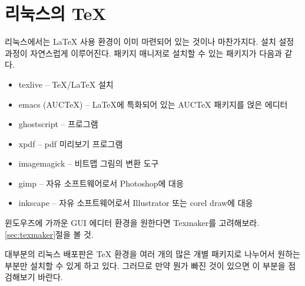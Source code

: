 \section{리눅스의 \TeX}

리눅스에서는 \LaTeX{} 사용 환경이 이미 마련되어 있는 것이나 마찬가지다.
설치 설정 과정이 자연스럽게 이루어진다.
패키지 매니저로 설치할 수 있는 패키지가 다음과 같다.

\begin{itemize}
\item texlive -- \TeX/\LaTeX{} 설치
\item emacs (AUCTeX) -- \LaTeX{}에 특화되어 있는 AUCTeX 패키지를 얹은 에디터
\item ghostscript -- \PSi{} 프로그램
\item xpdf -- pdf 미리보기 프로그램 
\item imagemagick -- 비트맵 그림의 변환 도구
\item gimp -- 자유 소프트웨어로서 Photoshop에 대응
\item inkscape -- 자유 소프트웨어로서 Illustrator 또는 corel draw에 대응
\end{itemize}

윈도우즈에 가까운 GUI 에디터 환경을 원한다면 Texmaker를 고려해보라. \ref{sec:texmaker}절을 볼 것.

대부분의 리눅스 배포판은 \TeX{} 환경을 여러 개의 많은 개별 패키지로 나누어서 원하는 부분만 설치할 수 있게 하고 있다.
그러므로 만약 뭔가 빠진 것이 있으면 이 부분을 점검해보기 바란다.
